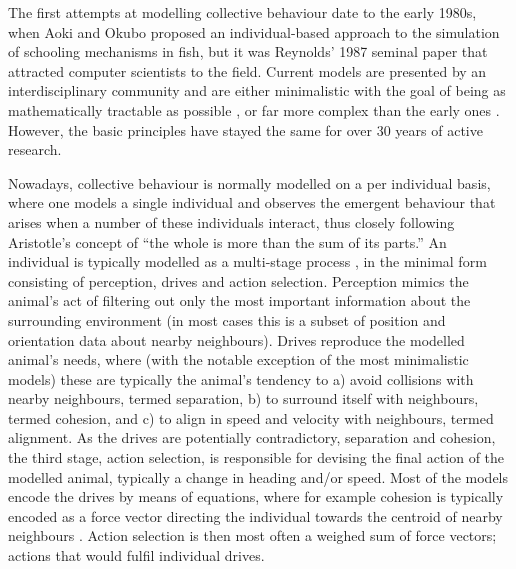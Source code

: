 The first attempts at modelling collective behaviour date to the early 1980s, when Aoki \cite{aoki1982simulation} and Okubo \cite{okubo1986dynamical} proposed an individual-based approach to the simulation of schooling mechanisms in fish, but it was Reynolds' 1987 seminal paper \cite{reynolds1987flocks} that attracted computer scientists to the field. Current models are presented by an interdisciplinary community and are either minimalistic with the goal of being as mathematically tractable as possible \cite{collignon2016stochastic,nagai2015collective,tanner2003fixed,tanner2003dynamic,toner1995longrange,vicsek1995novel}, or far more complex than the early ones \cite{couzin2002collective,demsar2014simulated,hemelrijk2008selforganized,hildenbrandt2010selforganized,pino2015modeling}. However, the basic principles have stayed the same for over 30 years of active research.

Nowadays, collective behaviour is normally modelled on a per individual basis, where one models a single individual and observes the emergent behaviour that arises when a number of these individuals interact, thus closely following Aristotle's concept of ``the whole is more than the sum of its parts.'' An individual is typically modelled as a multi-stage process \cite{lebarbajec2007boids,fine2013unifying}, in the minimal form consisting of perception, drives and action selection. Perception mimics the animal's act of filtering out only the most important information about the surrounding environment (in most cases this is a subset of position and orientation data about nearby neighbours). Drives reproduce the modelled animal's needs, where (with the notable exception of the most minimalistic models) these are typically the animal's tendency to a) avoid collisions with nearby neighbours, termed separation, b) to surround itself with neighbours, termed cohesion, and c) to align in speed and velocity with neighbours, termed alignment. As the drives are potentially contradictory, \eg separation and cohesion, the third stage, action selection, is responsible for devising the final action of the modelled animal, typically a change in heading and/or speed. Most of the models encode the drives by means of equations, where for example cohesion is typically encoded as a force vector directing the individual towards the centroid of nearby neighbours \cite{vicsek2012collective,lebarbajec2009organized}. Action selection is then most often a weighed sum of force vectors; actions that would fulfil individual drives.

